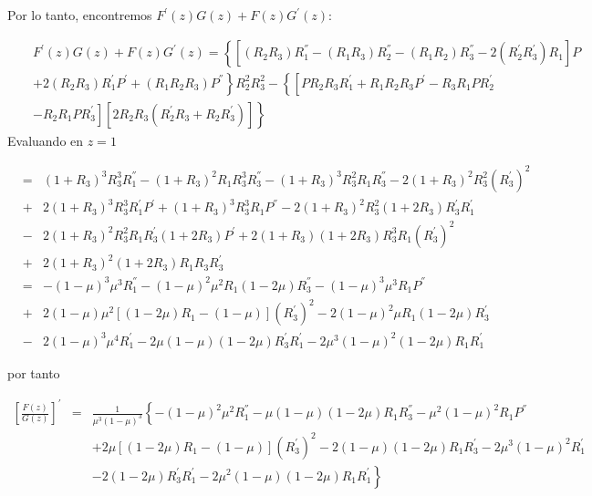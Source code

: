 Por lo tanto, encontremos $F^{'}\left(z\right)G\left(z\right)+F\left(z\right)G^{'}\left(z\right)$:

\begin{eqnarray*}
&&F^{'}\left(z\right)G\left(z\right)+F\left(z\right)G^{'}\left(z\right)=
\left\{\left[\left(R_{2}R_{3}\right)R_{1}^{''}
-\left(R_{1}R_{3}\right)R_{2}^{''}
-\left(R_{1}R_{2}\right)R_{3}^{''}
-2\left(R_{2}^{'}R_{3}^{'}\right)R_{1}\right]P\right.\\
&&\left.+2\left(R_{2}R_{3}\right)R_{1}^{'}P^{'}
+\left(R_{1}R_{2}R_{3}\right)P^{''}\right\}R_{2}^{2}R_{3}^{2}
-\left\{\left[PR_{2}R_{3}R_{1}^{'}+R_{1}R_{2}R_{3}P^{'}
-R_{3}R_{1}PR_{2}^{'}\right.\right.\\
&&\left.\left.
-R_{2}R_{1}PR_{3}^{'}\right]\left[2R_{2}R_{3}\left(R_{2}^{'}R_{3}+R_{2}R_{3}^{'}\right)\right]\right\}
\end{eqnarray*}
Evaluando en $z=1$

\begin{eqnarray*}
&=&\left(1+R_{3}\right)^{3}R_{3}^{3}R_{1}^{''}-\left(1+R_{3}\right)^{2}R_{1}R_{3}^{3}R_{3}^{''}
-\left(1+R_{3}\right)^{3}R_{3}^{2}R_{1}R_{3}^{''}-2\left(1+R_{3}\right)^{2}R_{3}^{2}
\left(R_{3}^{'}\right)^{2}\\
&+&2\left(1+R_{3}\right)^{3}R_{3}^{3}R_{1}^{'}P^{'}
+\left(1+R_{3}\right)^{3}R_{3}^{3}R_{1}P^{''}
-2\left(1+R_{3}\right)^{2}R_{3}^{2}\left(1+2R_{3}\right)R_{3}^{'}R_{1}^{'}\\
&-&2\left(1+R_{3}\right)^{2}R_{3}^{2}R_{1}R_{3}^{'}\left(1+2R_{3}\right)P^{'}
+2\left(1+R_{3}\right)\left(1+2R_{3}\right)R_{3}^{3}R_{1}\left(R_{3}^{'}\right)^{2}\\
&+&2\left(1+R_{3}\right)^{2}\left(1+2R_{3}\right)R_{1}R_{3}R_{3}^{'}\\
&=&-\left(1-\mu\right)^{3}\mu^{3}R_{1}^{''}-\left(1-\mu\right)^{2}\mu^{2}R_{1}\left(1-2\mu\right)R_{3}^{''}
-\left(1-\mu\right)^{3}\mu^{3}R_{1}P^{''}\\
&+&2\left(1-\mu\right)\mu^{2}\left[\left(1-2\mu\right)R_{1}-\left(1-\mu\right)\right]\left(R_{3}^{'}\right)^{2}
-2\left(1-\mu\right)^{2}\mu R_{1}\left(1-2\mu\right)R_{3}^{'}\\
&-&2\left(1-\mu\right)^{3}\mu^{4}R_{1}^{'}-2\mu\left(1-\mu\right)\left(1-2\mu\right)R_{3}^{'}R_{1}^{'}
-2\mu^{3}\left(1-\mu\right)^{2}\left(1-2\mu\right)R_{1}R_{1}^{'}
\end{eqnarray*}

por tanto

\begin{eqnarray*}
\left[\frac{F\left(z\right)}{G\left(z\right)}\right]^{'}&=&\frac{1}{\mu^{3}\left(1-\mu\right)^{3}}\left\{
-\left(1-\mu\right)^{2}\mu^{2}R_{1}^{''}-\mu\left(1-\mu\right)\left(1-2\mu\right)R_{1}R_{3}^{''}
-\mu^{2}\left(1-\mu\right)^{2}R_{1}P^{''}\right.\\
&&\left.+2\mu\left[\left(1-2\mu\right)R_{1}-\left(1-\mu\right)\right]\left(R_{3}^{'}\right)^{2}
-2\left(1-\mu\right)\left(1-2\mu\right)R_{1}R_{3}^{'}-2\mu^{3}\left(1-\mu\right)^{2}R_{1}^{'}\right.\\
&&\left.-2\left(1-2\mu\right)R_{3}^{'}R_{1}^{'}-2\mu^{2}\left(1-\mu\right)\left(1-2\mu\right)R_{1}R_{1}^{'}\right\}
\end{eqnarray*}

